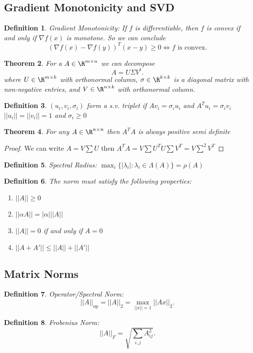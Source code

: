 \documentclass[a4paper]{article}
\newtheorem{thm}{Theorem}[section]
\newtheorem{defn}[thm]{Definition}
\begin{document}
\subsection{Gradient Monotonicity and SVD}
\begin{defn}
    Gradient Monotonicity: If $f$ is differentiable, then $f$ is convex if and only if $\nabla f(x)$ is monotone. So we can conclude \[
    (\nabla f(x) - \nabla f(y))^T(x-y)\geq 0 \iff f \text{ is convex}
    .\] 
\end{defn}
\begin{thm}
    For a $A\in \R^{m\times n}$ we can decompose \[
        A=U \Sigma V^t
    .\] where $U\in \R^{m \times k}$ with orthonormal column, $\sigma\in \R^{k\times k}$ is a diagonal matrix with non-negative entries, and $V\in \R^{n\times k}$ with orthonormal column.
\end{thm}
\begin{defn}
    $(u_i,v_i,\sigma_i)$ form a s.v. triplet if $Av_i=\sigma_i u_i$ and $A^T u_i=\sigma_i v_i$\\
    $||u_i||=||v_i||=1$ and $\sigma_i\geq 0$
\end{defn}
\begin{thm}
    For any $A\in \R^{n\times n}$ then $A^TA$ is always positive semi definite
\end{thm}
\begin{proof}
    We can write $A=V \sum U$ then $A^TA=V\sum U^T U \sum V^T=V \sum^2 V^T$
\end{proof}
\begin{defn}
    Spectral Radius: $\max_i\{|\lambda_i| : \lambda_i \in \Lambda(A)\}=\rho(A)$
\end{defn}
\begin{defn}
    The norm must satisfy the following properties:
    \begin{enumerate}
        \item $||A||\geq 0$
        \item $||\alpha A||= |\alpha|||A||$
        \item $||A||=0$ if and only if $A=0$
        \item $||A+A'||\leq ||A||+||A'||$
    \end{enumerate}
\end{defn}

\subsection{Matrix Norms}
\begin{defn}
    Operator/Spectral Norm: \[
    ||A||_{\text{op}}=||A||_2=\max_{||x||=1}||Ax||_2
    .\] 
\end{defn}
\begin{defn}
    Frobenius Norm: \[
    ||A||_F=\sqrt{\sum_{i,j}A_{ij}^2}
    .\] 
\end{defn}
\end{document}
